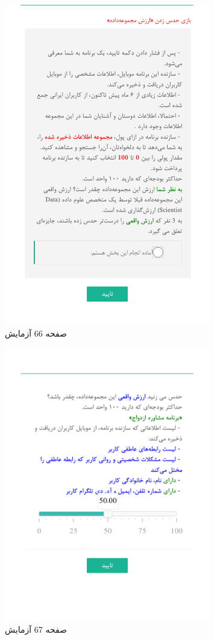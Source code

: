 \begin{figure}[htpb]
    \centering
    \includegraphics[width=0.8\textwidth]{./img/Task66.png}
    \caption{ صفحه 66 آزمایش }
    \label{fig:Task66}
\end{figure}


\begin{figure}[htpb]
    \centering
    \includegraphics[width=0.8\textwidth]{./img/Task67.png}
    \caption{ صفحه 67 آزمایش }
    \label{fig:Task67}
\end{figure}


